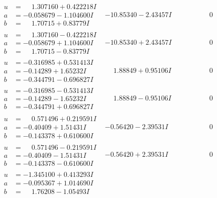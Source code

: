 \documentclass[1p]{elsarticle_modified}
\theoremstyle{definition}
\begin{document}
$$\begin{array}{c|c|c}
 \hline 
\begin{aligned}
u &= \phantom{-}1.307160 + 0.422218 I \\
a &= -0.058679 - 1.104600 I \\
b &= \phantom{-}1.70715 + 0.83779 I\end{aligned}
 & -10.85340 - 2.43457 I & \phantom{-0.000000 } 0 \\ \hline\begin{aligned}
u &= \phantom{-}1.307160 - 0.422218 I \\
a &= -0.058679 + 1.104600 I \\
b &= \phantom{-}1.70715 - 0.83779 I\end{aligned}
 & -10.85340 + 2.43457 I & \phantom{-0.000000 } 0 \\ \hline\begin{aligned}
u &= -0.316985 + 0.531413 I \\
a &= -0.14289 + 1.65232 I \\
b &= -0.344791 - 0.696827 I\end{aligned}
 & \phantom{-}1.88849 + 0.95106 I & \phantom{-0.000000 } 0 \\ \hline\begin{aligned}
u &= -0.316985 - 0.531413 I \\
a &= -0.14289 - 1.65232 I \\
b &= -0.344791 + 0.696827 I\end{aligned}
 & \phantom{-}1.88849 - 0.95106 I & \phantom{-0.000000 } 0 \\ \hline\begin{aligned}
u &= \phantom{-}0.571496 + 0.219591 I \\
a &= -0.40409 + 1.51431 I \\
b &= -0.143378 + 0.610600 I\end{aligned}
 & -0.56420 - 2.39531 I & \phantom{-0.000000 } 0 \\ \hline\begin{aligned}
u &= \phantom{-}0.571496 - 0.219591 I \\
a &= -0.40409 - 1.51431 I \\
b &= -0.143378 - 0.610600 I\end{aligned}
 & -0.56420 + 2.39531 I & \phantom{-0.000000 } 0 \\ \hline\begin{aligned}
u &= -1.345100 + 0.413293 I \\
a &= -0.095367 + 1.014690 I \\
b &= \phantom{-}1.76208 - 1.05493 I\end{aligned}

\end{array}$$
\end{document}
